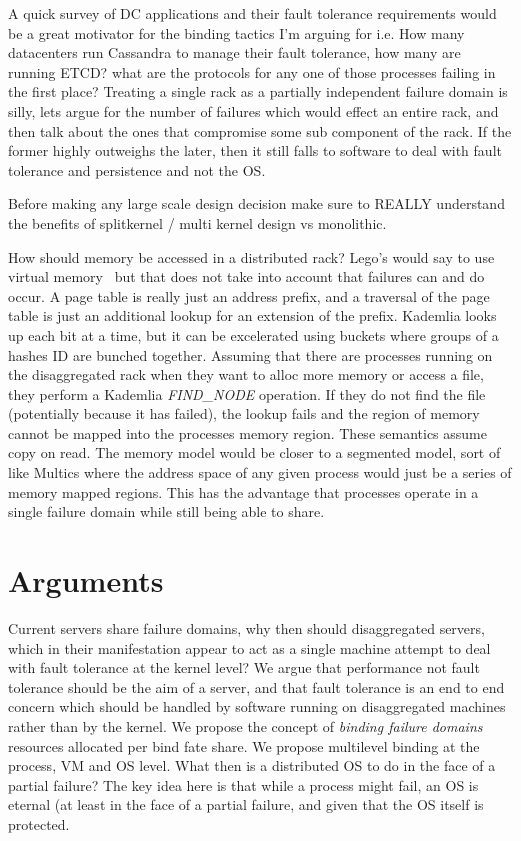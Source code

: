 A quick survey of DC applications and their fault tolerance requirements would
be a great motivator for the binding tactics I'm arguing for i.e. How many
datacenters run Cassandra to manage their fault tolerance, how many are
running ETCD? what are the protocols for any one of those processes failing in
the first place? Treating a single rack as a partially independent failure
domain is silly, lets argue for the number of failures which would effect an
entire rack, and then talk about the ones that compromise some sub component of
the rack. If the former highly outweighs the later, then it still falls to
software to deal with fault tolerance and persistence and not the OS.

Before making any large scale design decision make sure to REALLY understand
the benefits of splitkernel / multi kernel design vs monolithic.

How should memory be accessed in a distributed rack? Lego's would say to use
virtual memory~\cite{legoos} but that does not take into account that failures
can and do occur. A page table is really just an address prefix, and a
traversal of the page table is just an additional lookup for an extension of
the prefix. Kademlia looks up each bit at a time, but it can be excelerated
using buckets where groups of a hashes ID are bunched together. Assuming that
there are processes running on the disaggregated rack when they want to alloc
more memory or access a file, they perform a Kademlia \textit{FIND\_NODE}
operation. If they do not find the file (potentially because it has failed),
the lookup fails and the region of memory cannot be mapped into the processes
memory region. These semantics assume copy on read. The memory model would be
closer to a segmented model, sort of like Multics where the address space of
any given process would just be a series of memory mapped regions. This has the
advantage that processes operate in a single failure domain while still being
able to share.

\section{Arguments}
\label{sec:arguments}

Current servers share failure domains, why then should disaggregated servers, which
in their manifestation appear to act as a single machine attempt to deal with
fault tolerance at the kernel level? We argue that performance not fault
tolerance should be the aim of a server, and that fault tolerance is an end to
end concern which should be handled by software running on disaggregated
machines rather than by the kernel. We propose the concept of \textit{binding
failure domains} resources allocated per bind fate share. We propose multilevel
binding at the process, VM and OS level. What then is a distributed OS to do in
the face of a partial failure? The key idea here is that while a process might fail, an OS is eternal (at least in the face of a partial failure, and given that the OS itself is protected.


